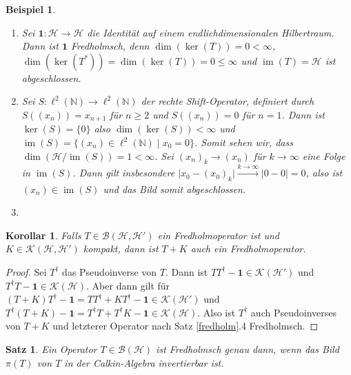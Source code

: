 \documentclass[11pt, hidelinks]{article}
\newcommand{\h}{\mathcal{H}}
\newcommand{\im}{\operatorname{im}}
\numberwithin{conj}{section}
\newtheorem{example}[conj]{Beispiel}
\newtheorem{theorem}[conj]{Satz}
\newtheorem{corollary}[conj]{Korollar}
\begin{document}
\begin{example}\noindent
    \begin{enumerate}
        \item Sei $\mathbf{1}: \h \to \h$ die Identität auf einem endlichdimensionalen Hilbertraum. Dann ist $\mathbf{1}$ Fredholmsch, denn $\dim(\ker(T)) = 0 < \infty$, $\dim(\ker(T^\ast)) = \dim(\ker(T)) = 0 \leq \infty$ und $\im(T) = \h$ ist abgeschlossen.
        \item Sei $S: \ell^2(\mathbb{N}) \to \ell^2(\mathbb{N})$ der rechte Shift-Operator, definiert durch $S((x_n)) = x_{n+1}$ für $n \geq 2$ und $S((x_n)) = 0$ für $n=1$. Dann ist $\ker(S) = \{0\}$ also $\dim(\ker(S)) < \infty$ und $\im(S) = \{ (x_n) \in \ell^2(\mathbb{N}) \; \vert \; x_0 = 0\}$. Somit sehen wir, dass $\dim(\h/\im(S)) = 1 < \infty$. Sei $(x_n)_k \to (x_n)$ für $k \to \infty$ eine Folge in $\im(S)$. Dann gilt insbesondere $\vert x_0 - (x_0)_k \vert \xrightarrow[]{k \to \infty} \vert 0 - 0 \vert = 0$, also ist $(x_n) \in \im(S)$ und das Bild somit abgeschlossen.
        \item 
    \end{enumerate}
\end{example}

\begin{corollary}
    Falls $T \in \mathcal{B}(\h,\h')$ ein Fredholmoperator ist und $K \in \mathcal{K}(\h,\h')$ kompakt, dann ist $T+K$ auch ein Fredholmoperator. 
\end{corollary}

\begin{proof}
Sei $T^\dagger$ das Pseudoinverse von $T$. Dann ist $TT^\dagger - \mathbf{1} \in \mathcal{K}(\h')$ und $T^\dagger T - \mathbf{1} \in \mathcal{K}(\h)$. Aber dann gilt für $(T+K)T^\dagger - \mathbf{1} = TT^\dagger + KT^\dagger - \mathbf{1} \in \mathcal{K}(\h')$ und $T^\dagger (T+K) -\mathbf{1} = T^\dagger T+ T^\dagger K -\mathbf{1}  \in \mathcal{K}(\h)$. Also ist $T^\dagger$ auch Pseudoinverses von $T+K$ und letzterer Operator nach Satz \ref{fredholm}.4 Fredholmsch.
\end{proof}

\begin{theorem}
    Ein Operator $T \in \mathcal{B}(\h)$ ist Fredholmsch genau dann, wenn das Bild $\pi(T)$ von $T$ in der Calkin-Algebra invertierbar ist.
\end{theorem}
\end{document}
